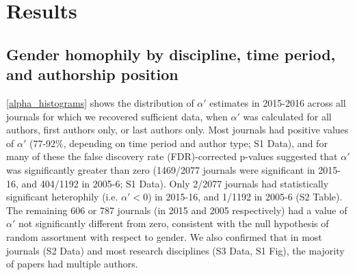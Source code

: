 \documentclass[12pt,]{article}
\begin{document}
\hypertarget{results}{%
\section{Results}\label{results}}

\hypertarget{gender-homophily-by-discipline-time-period-and-authorship-position}{%
\subsection{Gender homophily by discipline, time period, and authorship
position}\label{gender-homophily-by-discipline-time-period-and-authorship-position}}

\autoref{alpha_histograms} shows the distribution of \(\alpha'\)
estimates in 2015-2016 across all journals for which we recovered
sufficient data, when \(\alpha'\) was calculated for all authors, first
authors only, or last authors only. Most journals had positive values of
\(\alpha'\) (77-92\%, depending on time period and author type; S1
Data), and for many of these the false discovery rate (FDR)-corrected
p-values suggested that \(\alpha'\) was significantly greater than zero
(1469/2077 journals were significant in 2015-16, and 404/1192 in 2005-6;
S1 Data). Only 2/2077 journals had statistically significant heterophily
(i.e. \(\alpha' < 0\)) in 2015-16, and 1/1192 in 2005-6 (S2 Table). The
remaining 606 or 787 journals (in 2015 and 2005 respectively) had a
value of \(\alpha'\) not significantly different from zero, consistent
with the null hypothesis of random assortment with respect to gender. We
also confirmed that in most journals (S2 Data) and most research
disciplines (S3 Data, S1 Fig), the majority of papers had multiple
authors.
\end{document}
